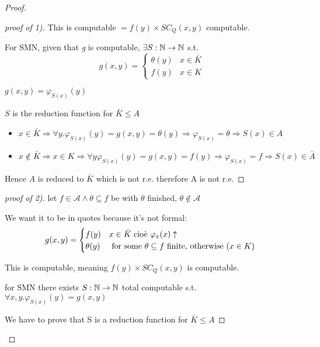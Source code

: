 \begin{proof}
\begin{proof}[proof of 1)]
    This is computable $ = f(y) \times SC_Q(x,y) $ computable.

    For SMN, given that \textit{g} is computable, $ \exists
    S:\mathbb{N}\rightarrow\mathbb{N} $ s.t.
    \begin{equation*}
      g(x,y) = \begin{cases}
        \theta(y) & x \in \bar{K} \\
        f(y) & x \in K
      \end{cases}
    \end{equation*}

    $ g(x,y) = \varphi_{S(x)}(y)$

    $S$ is the reduction function for $ \bar{K}\leq A $

    \begin{itemize}
    \item $ x\in\bar{K} \Rightarrow \forall y. \varphi_{S(x)}(y) = g(x,y) =
      \theta(y) \Rightarrow \varphi_{S(x)} = \theta \Rightarrow S(x) \in A $
    \item $ x\not\in\bar{K}\Rightarrow x\in K\Rightarrow\forall
      y\varphi_{S(x)}(y) = g(x,y)=f(y)\Rightarrow\varphi_{S(x)}=f\Rightarrow
      S(x)\in\bar{A}$
    \end{itemize}

    Hence $A$ is reduced to $ \bar{K} $ which is not r.e. therefore A is
    not r.e.

  \end{proof}

  \begin{proof}[proof of 2)]
    let $ f\in\mathcal{A}\land\theta\subseteq f $ be with $ \theta $
    finished, $ \theta\not\in\mathcal{A} $

    We want it to be in quotes because it's not formal: \begin{equation*}
      g(x,y) = \begin{cases}
        f(y) & x \in\bar{K} $ cioè $ \varphi_x(x)\uparrow \\
        \theta(y) & $ for some $ \theta\subseteq f $ finite, otherwise ($ x\in K $) $
      \end{cases}
    \end{equation*}

    This is computable, meaning $f(y) \times SC_Q(x,y) $ is
    computable.

    for SMN there exists $ S:\mathbb{N}\rightarrow\mathbb{N} $ total computable s.t. $
    \forall x,y. \varphi_{S(x)}(y) = g(x,y) $

    We have to prove that S is a reduction function for $ \bar{K}\leq A $


\end{proof}
\end{proof}
